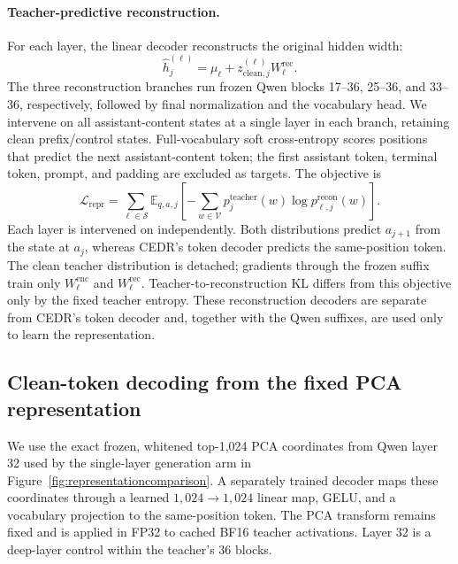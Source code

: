 \documentclass[11pt,letterpaper]{article}
\newcommand{\E}{\mathbb{E}}
\begin{document}
\paragraph{Teacher-predictive reconstruction.}
For each layer, the linear decoder reconstructs the original hidden width:
\begin{equation}
 \widehat h_j^{(\ell)}=\mu_\ell+z_{\mathrm{clean},j}^{(\ell)}W_\ell^{\mathrm{rec}}.
 \label{eq:representationreconstruction}
\end{equation}
The three reconstruction branches run frozen Qwen blocks 17--36, 25--36, and 33--36, respectively, followed by final normalization and the vocabulary head. We intervene on all assistant-content states at a single layer in each branch, retaining clean prefix/control states. Full-vocabulary soft cross-entropy scores positions that predict the next assistant-content token; the first assistant token, terminal token, prompt, and padding are excluded as targets. The objective is
\begin{equation}
 \mathcal L_{\mathrm{repr}}
 =\sum_{\ell\in\mathcal S}\E_{q,a,j}
 \left[-\sum_{w\in\mathcal V}p_j^{\mathrm{teacher}}(w)
 \log p_{\ell,j}^{\mathrm{recon}}(w)\right].
 \label{eq:representationloss}
\end{equation}
Each layer is intervened on independently. Both distributions predict $a_{j+1}$ from the state at $a_j$, whereas CEDR's token decoder predicts the same-position token. The clean teacher distribution is detached; gradients through the frozen suffix train only $W_\ell^{\mathrm{enc}}$ and $W_\ell^{\mathrm{rec}}$. Teacher-to-reconstruction KL differs from this objective only by the fixed teacher entropy. These reconstruction decoders are separate from CEDR's token decoder and, together with the Qwen suffixes, are used only to learn the representation.

\subsection{Clean-token decoding from the fixed PCA representation}
\label{app:representationdiagnostics}
We use the exact frozen, whitened top-1,024 PCA coordinates from Qwen layer 32 used by the single-layer generation arm in Figure~\ref{fig:representationcomparison}. A separately trained decoder maps these coordinates through a learned $1{,}024\!\to\!1{,}024$ linear map, GELU, and a vocabulary projection to the same-position token. The PCA transform remains fixed and is applied in FP32 to cached BF16 teacher activations. Layer 32 is a deep-layer control within the teacher's 36 blocks.
\end{document}
